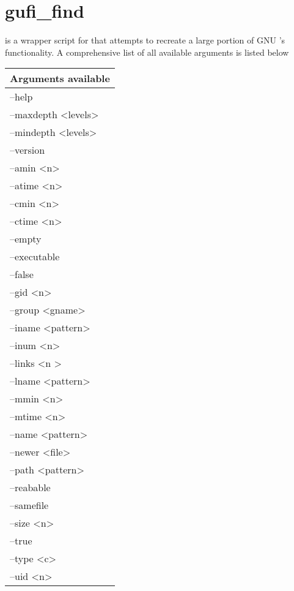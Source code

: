 \section{gufi\_find}
\gufifind is a wrapper script for \gufiquery that attempts to recreate
a large portion of GNU \find 's functionality. A comprehensive list of
all available arguments is listed below

\begin{table} [h]
  \centering
  \begin{tabular}{l}
    Arguments available \\\hline
    --help\\
    --maxdepth \textless levels\textgreater\\
    --mindepth \textless levels\textgreater\\
    --version\\
    --amin \textless n\textgreater\\
    --atime \textless n\textgreater\\
    --cmin \textless n\textgreater\\
    --ctime \textless n\textgreater\\
    --empty\\
    --executable\\
    --false\\
    --gid \textless n\textgreater\\
    --group \textless gname\textgreater\\
    --iname \textless pattern\textgreater\\
    --inum \textless n\textgreater\\
    --links \textless n \textgreater\\
    --lname \textless pattern\textgreater\\
    --mmin \textless n\textgreater\\
    --mtime \textless n\textgreater\\
    --name \textless pattern\textgreater\\
    --newer \textless file\textgreater\\
    --path \textless pattern\textgreater\\
    --reabable\\
    --samefile\\
    --size \textless n\textgreater\\
    --true\\
    --type \textless c\textgreater\\
    --uid \textless n\textgreater\\

\end{tabular}
\end{table}
